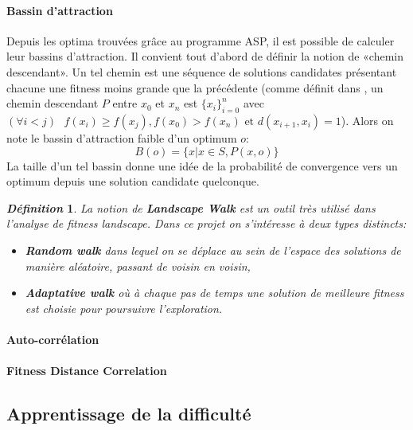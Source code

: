 \documentclass[a4paper, 11pt]{article}
\newcommand{\textquote}[1]{«#1»}
\newtheorem{definition}{\it\bfseries Définition}
\begin{document}
	\paragraph{Bassin d'attraction}{Depuis les optima trouvées grâce au programme ASP, il est possible de calculer leur bassins d'attraction. Il convient tout d'abord de définir la notion de \textquote{chemin descendant}. Un tel chemin est une séquence de solutions candidates présentant chacune une fitness moins grande que la précédente (comme définit dans \cite{?}, un chemin descendant $P$ entre $x_0$ et $x_n$ est $\{x_i\}_{i=0}^n$ avec $(\forall i < j)\text{ }f(x_i) \geq f(x_j), f(x_0) > f(x_n) \text{ et } d(x_{i+1}, x_i) = 1$). Alors on note le bassin d'attraction faible d'un optimum $o$:
	\begin{equation*}
	    B(o) = \{x | x \in S, P(x, o)\}
	\end{equation*}
La taille d'un tel bassin donne une idée de la probabilité de convergence vers un optimum depuis une solution candidate quelconque.
	}
	\begin{definition}
	\label{def-walk}
	La notion de \textbf{Landscape Walk} \cite{?} est un outil très utilisé dans l'analyse de fitness landscape. Dans ce projet on s'intéresse à deux types distincts: 
	\begin{itemize}
	    \item \textbf{Random walk} dans lequel on se déplace au sein de l'espace des solutions de manière aléatoire, passant de voisin en voisin,
	    \item \textbf{Adaptative walk} où à chaque pas de temps une solution de meilleure fitness est choisie pour poursuivre l'exploration.
	\end{itemize}
	
	\end{definition}
	\paragraph{Auto-corrélation}{
	
	}
	\paragraph{Fitness Distance Correlation}
	\subsection{Apprentissage de la difficulté}
	
\end{document}
